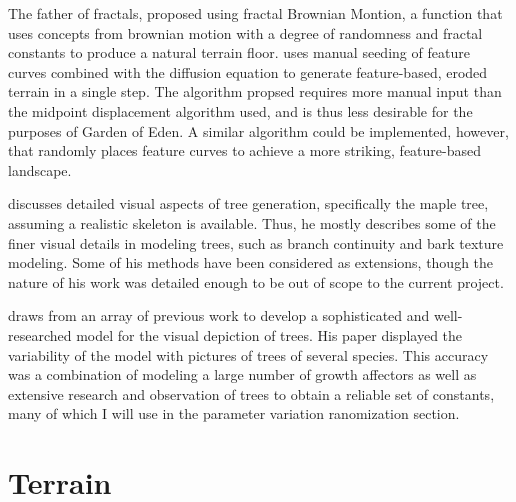 \documentclass{article}
\newcommand{\tab}{\hspace*{2em}}
\begin{document}
    \tab The father of fractals, \citet{mandelbrot68} proposed using fractal Brownian Montion, a
function that uses concepts from brownian motion with a degree of randomness and fractal constants
to produce a natural terrain floor.
    \tab \citet{hnaidi10} uses manual seeding of feature curves combined with the diffusion
equation to generate feature-based, eroded terrain in a single step. The algorithm propsed requires
more manual input than the midpoint displacement algorithm used, and is thus less desirable for
the purposes of Garden of Eden. A similar algorithm could be implemented, however, that randomly
places feature curves to achieve a more striking, feature-based landscape.


    \tab \citet{bloomenthal85} discusses detailed visual aspects of tree generation, specifically
the maple tree, assuming a realistic skeleton is available. Thus, he mostly describes some of the
finer visual details in modeling trees, such as branch continuity and bark texture modeling. Some
of his methods have been considered as extensions, though the nature of his work was detailed
enough to be out of scope to the current project.


    \tab \citet{weber95} draws from an array of previous work to develop a sophisticated and
well-researched model for the visual depiction of trees. His paper displayed the variability of the
model with pictures of trees of several species. This accuracy was a combination of modeling a
large number of growth affectors as well as extensive research and observation of trees to obtain
a reliable set of constants, many of which I will use in the parameter variation ranomization
section.

    \section{Terrain}
\end{document}
